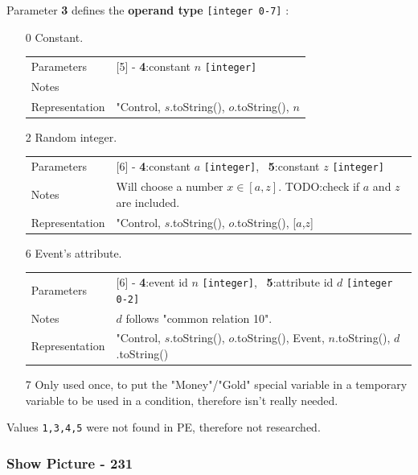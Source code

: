 \documentclass[11pt]{article}
\begin{document}
Parameter \textbf{3} defines the \textbf{operand type} \verb|[integer 0-7]| :
\begin{itemize}
	
	\item[0] Constant.
	
	\begin{tabular}{|a l|}
		\hline
		Parameters & [5] - \textbf{4}:constant $n$ \verb|[integer]| \\
		Notes &  \\
		Representation & "Control, $s$.toString(), $o$.toString(), $n$ \\
		\hline
	\end{tabular}
	
	\item[2] Random integer.
	
	\begin{tabular}{|a l|}
		\hline
		Parameters & [6] - \textbf{4}:constant $a$ \verb|[integer]|, \ \textbf{5}:constant $z$ \verb|[integer]| \\
		Notes & Will choose a number $x \in [a,z]$. TODO:check if $a$ and $z$ are included. \\
		Representation & "Control, $s$.toString(), $o$.toString(), [$a$,$z$] \\
		\hline
	\end{tabular}
	
	\item[6] Event's attribute.
	
	\begin{tabular}{|a l|}
		\hline
		Parameters & [6] - \textbf{4}:event id $n$ \verb|[integer]|, \ \textbf{5}:attribute id $d$ \verb|[integer 0-2]| \\
		Notes & $d$ follows "common relation 10". \\
		Representation & "Control, $s$.toString(), $o$.toString(), Event, $n$.toString(), $d$.toString() \\
		\hline
	\end{tabular}
	
	\item[7] Only used once, to put the "Money"/"Gold" special variable in a temporary variable to be used in a condition, therefore isn't really needed.
	
\end{itemize}

Values \verb|1,3,4,5| were not found in PE, therefore not researched.


\subsubsection{Show Picture - 231}
\label{sec:showpicture}
\end{document}

